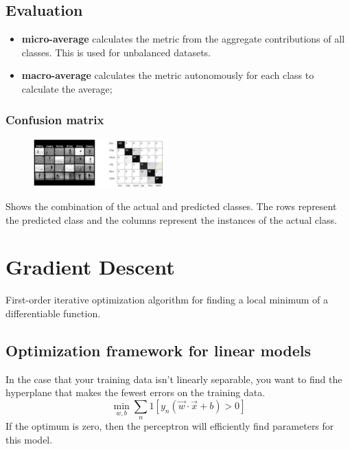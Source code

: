 \documentclass[a4paper,6pt,twocolumn,fleqn]{article}
\begin{document}
\subsection{Evaluation} %
\begin{itemize}
    \item \textbf{micro-average} calculates the metric from the aggregate contributions of all classes. This is used for unbalanced datasets.
    \item \textbf{macro-average} calculates the metric autonomously for each class to calculate the average;
\end{itemize}
\subsubsection{Confusion matrix} %
\begin{figure}[h]
    \vspace{-10pt}
	\begin{center}
		\includegraphics[width=0.45\textwidth]{036}
	\end{center}
    \vspace{-20pt}
\end{figure}
Shows the combination of the actual and predicted classes. The rows represent the predicted class and the columns represent the instances of the actual class.

\section{Gradient Descent}
First-order iterative optimization algorithm for finding a local minimum of a differentiable function.

\subsection{Optimization framework for linear models} %
In the case that your training data isn't linearly separable, you want to find the hyperplane that makes the fewest errors on the training data.
\begin{equation}
    \min_{w,b} \sum_n 1 \left[y_n (\vec w \cdot \vec x + b) > 0\right]
\end{equation}
If the optimum is zero, then the perceptron will efficiently find parameters for this model.
\end{document}
